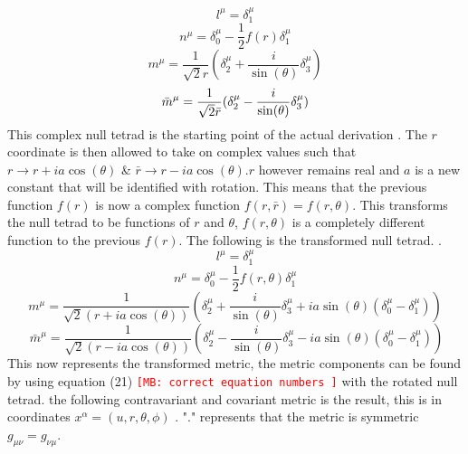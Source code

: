 \documentclass[12pt]{iopart}
\def\mbc#1{\textcolor{red}{\tt[MB: #1]}}
\begin{document}
 \begin{equation} 
  l^{\mu}=\delta^{\mu}_1
 \end{equation}
 \begin{equation}
 n^{\mu}=\delta^{\mu}_0-\frac{1}{2}f(r)\delta^{\mu}_1
 \end{equation}
 \begin{equation} 
 m^{\mu}=\frac{1}{\sqrt{2}r}(\delta^{\mu}_2+\frac{i}{\sin(\theta)}\delta^{\mu}_3)
 \end{equation}
 \begin{equation} 
 \bar{m}^{\mu}=\frac{1}{\sqrt{2}\Bar{r}}(\delta^{\mu}_2-\frac{i}{\sin(\theta)}\delta^{\mu}_3)
 \end{equation}
 This complex null tetrad is the starting point of the actual derivation \cite{Drake:1997hh}. The $r$ coordinate is then allowed to take on complex values such that $r \rightarrow r+ia\cos(\theta)$ \& $\bar{r} \rightarrow r-ia\cos(\theta)$.$r$ however remains real and $a$ is a new constant that will be identified with rotation. This means that the previous function $f(r)$ is now a complex function $f(r,\bar{r})=f(r,\theta)$. This transforms the null tetrad to be functions of $r$ and $\theta$, $f(r,\theta)$ is a completely different function to the previous $f(r)$. The following is the transformed null tetrad. \cite{Drake:1997hh}.
 \begin{equation} 
 l^{\mu}=\delta^{\mu}_1
 \end{equation}
 \begin{equation}
 n^{\mu}=\delta^{\mu}_0-\frac{1}{2}f(r,\theta)\delta^{\mu}_1
 \end{equation}
 \begin{equation} 
 m^{\mu}=\frac{1}{\sqrt{2}(r+ia\cos(\theta))}(\delta^{\mu}_2+\frac{i}{\sin(\theta)}\delta^{\mu}_3+ia\sin(\theta)(\delta^{\mu}_0-\delta^{\mu}_1))
 \end{equation}
 \begin{equation} \
 \bar{m}^{\mu}=\frac{1}{\sqrt{2}(r-ia\cos(\theta))}(\delta^{\mu}_2-\frac{i}{\sin(\theta)}\delta^{\mu}_3-ia\sin(\theta)(\delta^{\mu}_0-\delta^{\mu}_1))
 \end{equation}
 This now represents the transformed metric, the metric components can be found by using equation (21) \mbc{correct equation numbers } with the rotated null tetrad. the following contravariant and covariant metric is the result, this is in coordinates $x^\alpha = (u,r,\theta , \phi)$ \cite{Drake:1997hh}. "." represents that the metric is symmetric $g_{\mu \nu}=g_{\nu \mu}$.
\\
\end{document}
